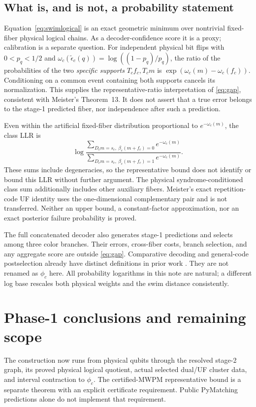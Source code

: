 \documentclass[11pt]{article}
\theoremstyle{definition}
\theoremstyle{plain}
\theoremstyle{remark}
\newcommand{\eps}{\epsilon}
\begin{document}
\subsection{What is, and is not, a probability statement}
Equation~\eqref{eq:swimlogical} is an exact geometric minimum over
nontrivial fixed-fiber physical logical chains. As a decoder-confidence
score it is a proxy; calibration is a separate question.
For independent physical bit flips with $0<p_q<1/2$ and
$\omega_c(\widetilde\eps_c(q))=\log((1-p_q)/p_q)$, the ratio of
the probabilities of the two \emph{specific supports} $T_cf_c,T_cm$
is $\exp(\omega_c(m)-\omega_c(f_c))$.
Conditioning on a common event containing both supports cancels its
normalization. This supplies the representative-ratio interpretation
of \eqref{eq:gap}, consistent with Meister's Theorem~13.
It does not assert that a true error belongs to the stage-1 predicted
fiber, nor independence after such a prediction.

Even within the artificial fixed-fiber distribution proportional to
$e^{-\omega_c(m)}$, the class LLR is
\[
 \log\frac{\sum_{D_cm=s_c,\ \beta_c(m+f_c)=0}e^{-\omega_c(m)}}
               {\sum_{D_cm=s_c,\ \beta_c(m+f_c)=1}e^{-\omega_c(m)}} .
\]
These sums include degeneracies, so the representative bound does
not identify or bound this LLR without further argument.
The physical syndrome-conditioned class sum additionally includes
other auxiliary fibers. Meister's exact repetition-code UF identity
\cite[Theorem~10]{Meister} uses the one-dimensional complementary
pair and is not transferred. Neither an upper bound, a constant-factor
approximation, nor an exact posterior failure probability is proved.

The full concatenated decoder also generates stage-1 predictions and
selects among three color branches. Their errors, cross-fiber costs,
branch selection, and any aggregate score are outside \eqref{eq:gap}.
Comparative decoding and general-code postselection already have
distinct definitions in prior work \cite{Postselection,ForcedGap}.
They are not renamed as $\phi_c$ here.
All probability logarithms in this note are natural; a different log
base rescales both physical weights and the swim distance consistently.

\section{Phase-1 conclusions and remaining scope}\label{sec:next}
The construction now runs from physical qubits through the resolved
stage-2 graph, its proved physical logical quotient, actual selected
dual/UF cluster data, and interval contraction to $\phi_c$.
The certified-MWPM representative bound is a separate theorem with
an explicit certificate requirement. Public PyMatching predictions
alone do not implement that requirement.
\end{document}
